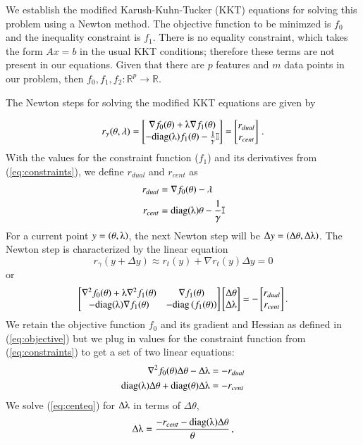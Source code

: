 \documentclass[11pt]{article}
\begin{document}
We establish the modified Karush-Kuhn-Tucker (KKT) equations for solving this problem using a Newton method. The objective function to be minimzed is $f_0$ and the inequality constraint is $f_1$. There is no equality constraint, which takes the form $Ax = b$ in the usual KKT conditions; therefore these terms are not present in our equations. Given that there are $p$ features and $m$ data points in our problem, then $f_0, f_1, f_2: \mathbb{R}^p \rightarrow \mathbb{R}.$ 

The Newton steps for solving the modified KKT equations are given by 

\[r_\gamma(\theta, \lambda) = \begin{bmatrix}
\nabla f_0(\theta) + \lambdaup\nabla f_1(\theta)\\
-\text{diag}(\lambdaup)f_1(\theta) - \frac{1}{\gamma}\mathbb{I}
\end{bmatrix} = \begin{bmatrix}
r_{dual}\\r_{cent}
\end{bmatrix}\,.\]
With the values for the constraint function ($f_1$) and its derivatives from (\ref{eq:constraints}), we define  $r_{dual}$ and $r_{cent}$ as 
\begin{align}
r_{dual}&= \nabla f_0(\theta) - \lambda\label{eq:rdual}\\
r_{cent}&= \text{diag}(\lambdaup)\theta - \frac{1}{\gamma}\mathbb{I}
\end{align}
For a current point $y = \left(\theta, \lambdaup\right)$, the next Newton step will be $\Delta y = \left(\Delta\theta, \Delta\lambdaup\right)$. The Newton step is characterized by the linear equation
\[r_\gamma(y + \Delta y) \approx r_t(y) + \nabla r_t(y)\Delta y = 0\] or 
\[\begin{bmatrix}
\nabla^2f_0(\theta) + \lambdaup\nabla^2f_1(\theta)&\nabla f_1(\theta)\\
-\text{diag}(\lambdaup)\nabla f_1(\theta)&-\text{diag}\left(f_1(\theta)\right)
\end{bmatrix}\begin{bmatrix}
\Delta\theta \\ \Delta\lambdaup
\end{bmatrix} = - \begin{bmatrix}
r_{dual}\\r_{cent}
\end{bmatrix}.\]
We retain the objective function $f_0$ and its gradient and Hessian as defined in (\ref{eq:objective}) but we plug in values for the constraint function from (\ref{eq:constraints}) to get a set of two linear equations:
\begin{align}
\nabla^2f_0(\theta)\Delta\theta - \Delta\lambdaup &= -r_{dual}\label{eq:dualeq}\\
\text{diag}(\lambdaup)\Delta\theta + \text{diag}(\theta)\Delta\lambdaup &= -r_{cent}\,\label{eq:centeq}
\end{align}
We solve (\ref{eq:centeq}) for $\Delta\lambdaup$ in terms of $\Delta\theta$,
\begin{equation}
\Delta\lambdaup = \frac{-r_{cent} - \text{diag}(\lambdaup)\Delta\theta}{\theta}\, ,\label{eq:dellam}
\end{equation}
\end{document}
